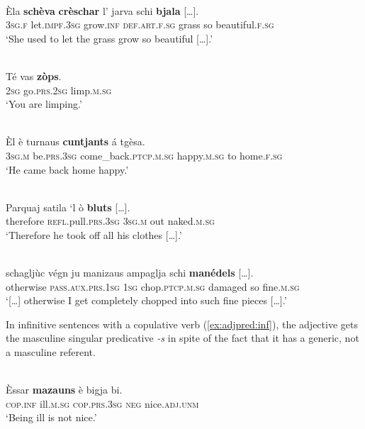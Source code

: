 \ea
\label{schèwithagr}
\\
\gll    Èla \textbf{schèva} \textbf{crèschar} l’ jarva schi \textbf{bjala} […].\\
    \textsc{3sg.f} let.\textsc{impf.3sg} grow.\textsc{inf} \textsc{def.art.f.sg} grass so beautiful.\textsc{f.sg} \\
\glt `She used to let the grass grow so beautiful […].'
\z
 
 \ea\label{Ex:adj.agr3}
 \\
 \gll  Té vas \textbf{zòps}.\\
 \textsc{2sg} go.\textsc{prs.2sg} limp.\textsc{m.sg} \textsc{} \textsc{} \textsc{} \textsc{} \textsc{} \\
 \glt `You are limping.'
 \z
 
 \ea
 \label{ex:adj.agr4}
 \\
 \gll Èl è turnaus \textbf{cuntjants} á tgèsa.\\
 \textsc{3sg.m} be.\textsc{prs.3sg} come\_back.\textsc{ptcp.m.sg} happy.\textsc{m.sg} to home.\textsc{f.sg} \\
 \glt `He came back home happy.'
 \z
 
 \ea\label{ex:adj.agr5}
 \\
 \gll    Parquaj satila ‘l ò \textbf{bluts} […].\\
 therefore \textsc{refl}.pull.\textsc{prs.3sg} \textsc{3sg.m} out naked.\textsc{m.sg}\\
 \glt `Therefore he took off all his clothes […].'
 \z
 
 \ea\label{ex:adj.agr6}
 \\
 \gll    […] schagljùc végn ju manizaus ampaglja schi \textbf{manédels} […].\\
 {} otherwise \textsc{pass.aux.prs.1sg} \textsc{1sg} chop.\textsc{ptcp.m.sg} damaged so fine.\textsc{m.sg}\\
 \glt `[…] otherwise I get completely chopped into such fine pieces […].'
 \z
 
 In infinitive sentences with a copulative verb (\ref{ex:adjpred:inf}), the adjective gets the masculine singular predicative \textit{-s} in spite of the fact that it has a generic, not a masculine referent.
 
 \ea
 \label{ex:adjpred:inf}
 \\
 \gll Èssar \textbf{mazauns} è bigja bi.\\
 \textsc{cop.inf} ill.\textsc{m.sg} \textsc{cop.prs.3sg} \textsc{neg} nice.\textsc{adj.unm}\\
 \glt `Being ill is not nice.'
 \z
 
